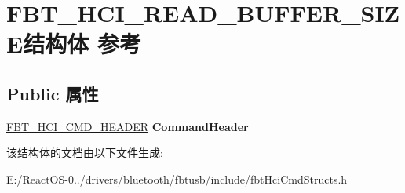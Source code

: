 \hypertarget{struct_f_b_t___h_c_i___r_e_a_d___b_u_f_f_e_r___s_i_z_e}{}\section{F\+B\+T\+\_\+\+H\+C\+I\+\_\+\+R\+E\+A\+D\+\_\+\+B\+U\+F\+F\+E\+R\+\_\+\+S\+I\+Z\+E结构体 参考}
\label{struct_f_b_t___h_c_i___r_e_a_d___b_u_f_f_e_r___s_i_z_e}
\subsection*{Public 属性}
\begin{DoxyCompactItemize}
\item 
\mbox{\label{struct_f_b_t___h_c_i___r_e_a_d___b_u_f_f_e_r___s_i_z_e_a01ef21e8380a36d9aeb788f01539da86}} 
\hyperlink{struct_f_b_t___h_c_i___c_m_d___h_e_a_d_e_r}{F\+B\+T\+\_\+\+H\+C\+I\+\_\+\+C\+M\+D\+\_\+\+H\+E\+A\+D\+ER} {\bfseries Command\+Header}
\end{DoxyCompactItemize}


该结构体的文档由以下文件生成\+:\begin{DoxyCompactItemize}
\item 
E\+:/\+React\+O\+S-\/0../drivers/bluetooth/fbtusb/include/fbt\+Hci\+Cmd\+Structs.\+h\end{DoxyCompactItemize}
